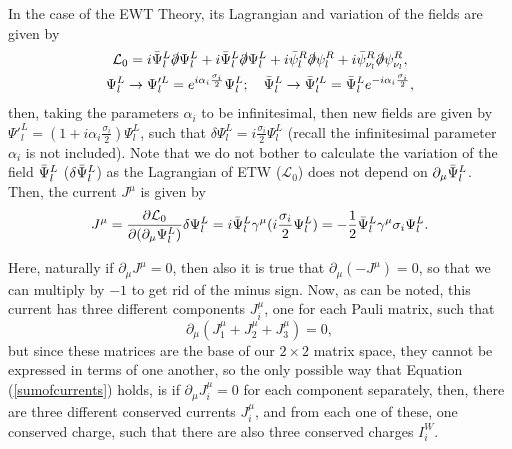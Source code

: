 In the case of the EWT Theory, its Lagrangian and variation of the fields are given by
\begin{gather*}
    \mathcal{L}_0 = i\Bar{\Psi}^L_l\slashed{\partial}\Psi^L_l + i\Bar{\Psi}^L_l\slashed{\partial}\Psi^L_l + i\Bar{\psi}^R_l\slashed{\partial}\psi^R_l + i\Bar{\psi}^R_{\nu_l}\slashed{\partial}\psi^R_{\nu_l}, \\
    \Psi^L_l \rightarrow \Psi'^L_l = e^{i\alpha_i\frac{\sigma_i}{2}}\Psi^L_l; \quad \Bar{\Psi}^L_l \rightarrow \Bar{\Psi}'^L_l = \Bar{\Psi}^L_le^{-i\alpha_i\frac{\sigma_i}{2}},
\end{gather*}
then, taking the parameters $\alpha_i$ to be infinitesimal, then new fields are given by $\Psi'^L_l = (1 + i\alpha_i\frac{\sigma_i}{2})\Psi^L_l$, such that $\delta\Psi^L_l = i\frac{\sigma_i}{2}\Psi^L_l$ (recall the infinitesimal parameter $\alpha_i$ is not included). Note that we do not bother to calculate the variation of the field $\Bar{\Psi}^L_l$ ($\delta\Bar{\Psi}^L_l$) as the Lagrangian of ETW ($\mathcal{L}_0$) does not depend on $\partial_{\mu}\Bar{\Psi}^L_l$. Then, the current $J^{\mu}$ is given by
\begin{align*}
    J^{\mu} = \dfrac{\partial\mathcal{L}_0}{\partial(\partial_{\mu}\Psi^L_l)}\delta\Psi^L_l = i\Bar{\Psi}^L_l\gamma^{\mu}(i\dfrac{\sigma_i}{2}\Psi^L_l) = -\dfrac{1}{2}\Bar{\Psi}^L_l\gamma^{\mu}\sigma_i\Psi^L_l.
\end{align*}

Here, naturally if $\partial_{\mu}J^{\mu} = 0$, then also it is true that $\partial_{\mu}(-J^{\mu}) = 0$, so that we can multiply by $-1$ to get rid of the minus sign. Now, as can be noted, this current has three different components $J^{\mu}_i$, one for each Pauli matrix, such that
\begin{equation}
\label{sumofcurrents}
    \partial_{\mu}(J^{\mu}_1 + J^{\mu}_2 + J^{\mu}_3) = 0,
\end{equation}
but since these matrices are the base of our $2\times2$ matrix space, they cannot be expressed in terms of one another, so the only possible way that Equation (\ref{sumofcurrents}) holds, is if $\partial_{\mu}J^{\mu}_i = 0$ for each component separately, then, there are three different conserved currents $J^{\mu}_i$, and from each one of these, one conserved charge, such that there are also three conserved charges $I^W_i$. 

